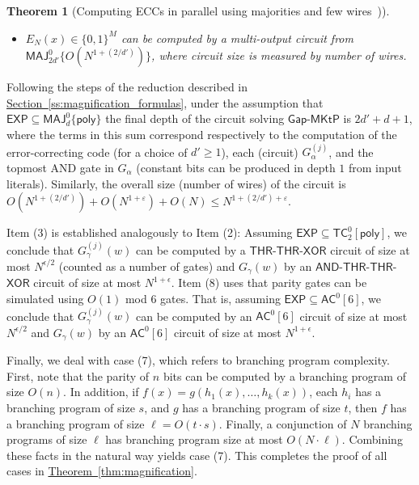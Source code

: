 \documentclass[11pt]{article}
\numberwithin{equation}{section}
\newtheorem{theorem}{Theorem}[section]
\theoremstyle{definition}
\theoremstyle{plain}
\newcommand{\expref}[2]{\hyperref[#2]{#1~\ref{#2}}}
\newcommand{\gapmktp}{\mathsf{Gap}$-$\mathsf{MKtP}}
\begin{document}
\begin{theorem}[Computing ECCs in parallel using majorities and few wires~\cite{RoeiTell18})]
\begin{itemize}
\item $E_N(x) \in \{0,1\}^M$ can be computed by a multi-output circuit from $\mathsf{MAJ}^0_{2d'}\{O(N^{1 + (2/d')})\}$, where circuit size is measured by number of wires.
\end{itemize}
\end{theorem}

\vspace{0.2cm}

 Following the steps of the reduction described in \expref{Section}{ss:magnification_formulas}, under the assumption that $\mathsf{EXP} \subseteq \mathsf{MAJ}^0_d\{\mathsf{poly}\}$ the final depth of the circuit solving $\gapmktp$ is $2d' + d + 1$, where the terms in this sum correspond respectively to the computation of the error-correcting code (for a choice of $d'\geq 1$), each (circuit) $G^{(j)}_\alpha$, and the topmost AND gate in $G_\alpha$ (constant bits can be produced in depth $1$ from input literals). Similarly, the overall size (number of wires) of the circuit is $O(N^{1 + (2/d')}) + O(N^{1 + \varepsilon}) + O(N) \leq N^{1 + (2/d') + \varepsilon}$.

Item (3) is established analogously to Item (2): Assuming $\mathsf{EXP} \subseteq \mathsf{TC}^0_2[\mathsf{poly}]$, we conclude that $G^{(j)}_{\gamma}(w)$ can be computed by a  $\mathsf{THR}$-$\mathsf{THR}$-$\mathsf{XOR}$ circuit of size at most $N^{\epsilon/2}$ (counted as a number of gates) and $G_{\gamma}(w)$ by an $\mathsf{AND}$-$\mathsf{THR}$-$\mathsf{THR}$-$\mathsf{XOR}$ circuit of size at most $N^{1 + \epsilon}$. Item (8) uses that parity gates can be simulated using $O(1)$ mod $6$ gates. That is, assuming $\mathsf{EXP} \subseteq \mathsf{AC}^0[6]$, we conclude that $G^{(j)}_{\gamma}(w)$ can be computed by an $\mathsf{AC}^0[6]$ circuit of size at most $N^{\epsilon/2}$ and $G_{\gamma}(w)$ by an $\mathsf{AC}^0[6]$ circuit of size at most $N^{1 + \epsilon}$.

Finally, we deal with case (7), which refers to branching program complexity.  First, note that the parity of $n$ bits can be computed by a branching program of size $O(n)$. In addition, if $f(x) = g(h_1(x), \ldots, h_k(x))$, each $h_i$ has a branching program of size $s$, and $g$ has a branching program of size $t$, then $f$ has a branching program of size $\ell = O(t \cdot s)$. Finally, a conjunction of $N$ branching programs of size $\ell$ has branching program size at most $O(N \cdot \ell)$. Combining these facts in the natural way yields case (7). This completes the proof of all cases in \expref{Theorem}{thm:magnification}.
\end{document}
